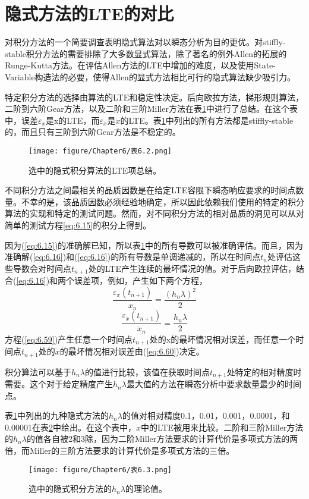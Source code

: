 \section{隐式方法的LTE的对比}
对积分方法的一个简要调查表明隐式算法对以瞬态分析为目的更优。对stiffly-stable积分方法的需要排除了大多数显式算法，除了著名的例外Allen的拓展的Runge-Kutta方法。在评估Allen方法的LTE中增加的难度，以及使用State-Variable构造法的必要，使得Allen的显式方法相比可行的隐式算法缺少吸引力。

特定积分方法的选择由算法的LTE和稳定性决定。后向欧拉方法，梯形规则算法，二阶到六阶Gear方法，以及二阶和三阶Miller方法在表\ref{表6.2}中进行了总结。在这个表中，误差$\varepsilon_x$是x的LTE，而$\varepsilon_{\dot{x}}$是$\dot{x}$的LTE。表\ref{表6.2}中列出的所有方法都是stiffly-stable的，而且只有三阶到六阶Gear方法是不稳定的。
\begin{figure}[htbp]
\small
    \centering
    \texttt{[image: figure/Chapter6/表6.2.png]}
    \caption{选中的隐式积分算法的LTE项总结。}
    \label{表6.2}
\end{figure}

不同积分方法之间最相关的品质因数是在给定LTE容限下瞬态响应要求的时间点数量。不幸的是，该品质因数必须经验地确定，所以因此依赖我们使用的特定的积分算法的实现和特定的测试问题。然而，对不同积分方法的相对品质的洞见可以从对简单的测试方程\ref{eq:6.15}的积分上得到。

因为(\ref{eq:6.15})的准确解已知，所以表\ref{表6.2}中的所有导数可以被准确评估。而且，因为准确解(\ref{eq:6.16})和(\ref{eq:6.16})的所有导数是单调递减的，所以在时间点$t_n$处评估这些导数会对时间点$t_{n+1}$处的LTE产生连续的最坏情况的值。对于后向欧拉评估，结合(\ref{eq:6.16})和两个误差项，例如，产生如下两个方程，
\begin{equation}
    \frac{\varepsilon_x(t_{n+1})}{x_n} = \frac{(h_n\lambda)^2}{2}
    \label{eq:6.59}
\end{equation}
\begin{equation}
    \frac{\varepsilon_{\dot{x}}(t_{n+1})}{\dot{x}_n} = \frac{h_n\lambda}{2}
    \label{eq:6.60}
\end{equation}
方程(\ref{eq:6.59})产生任意一个时间点$t_{n+1}$处的x的最坏情况相对误差，而任意一个时间点$t_{n+1}$处的$\dot{x}$的最坏情况相对误差由(\ref{eq:6.60})决定。

积分算法可以基于$h_n\lambda$的值进行比较，该值在获取时间点$t_{n+1}$处特定的相对精度时需要。这个对于给定精度产生$h_n\lambda$最大值的方法在瞬态分析中要求数量最少的时间点。

表\ref{表6.2}中列出的九种隐式方法的$h_n\lambda$的值对相对精度0.1，0.01，0.001，0.0001，和0.00001在表\ref{表6.3}中给出。在这个表中，$\dot{x}$中的LTE被用来比较。二阶和三阶Miller方法的$h_n\lambda$的值各自被2和3除，因为二阶Miller方法要求的计算代价是多项式方法的两倍，而Miller的三阶方法要求的计算代价是多项式方法的三倍。
\begin{figure}[htbp]
\small
    \centering
    \texttt{[image: figure/Chapter6/表6.3.png]}
    \caption{选中的隐式积分方法的$h_n\lambda$的理论值。}
    \label{表6.3}
\end{figure}

